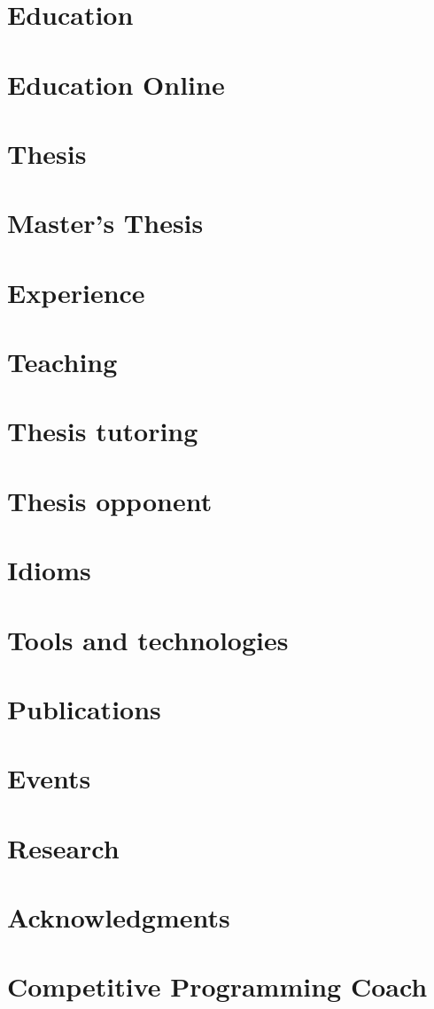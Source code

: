 \makecvtitle

\section{Education}

\section{Education Online}

\section{Thesis}


\section{Master's Thesis}

\section{Experience}


\section{Teaching}

\section{Thesis tutoring}

\section{Thesis opponent}


\section{Idioms}

\section{Tools and technologies}

\section{Publications}

\section{Events}

\section{Research}

\section{Acknowledgments}

\section{Competitive Programming Coach}

